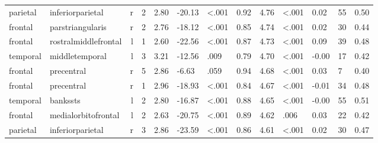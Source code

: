 \documentclass{article}
\begin{document}
\begin{longtable}{llrR{1.3cm}R{1cm}R{1.3cm}R{1cm}R{1cm}R{1.3cm}R{1cm}R{1.8cm}R{1.3cm}R{1.8cm}}
  parietal &          inferiorparietal &    r &         2 &                  2.80 &           -20.13 &      \textless.001 &                               0.92 &                          4.76 &                   \textless.001 &   0.02 &     55 &      0.50 \\
   frontal &          parstriangularis &    r &         2 &                  2.76 &           -18.12 &      \textless.001 &                               0.85 &                          4.74 &                   \textless.001 &   0.02 &     30 &      0.44 \\
   frontal &      rostralmiddlefrontal &    l &         1 &                  2.60 &           -22.56 &      \textless.001 &                               0.87 &                          4.73 &                   \textless.001 &   0.09 &     39 &      0.48 \\
  temporal &            middletemporal &    l &         3 &                  3.21 &           -12.56 &               .009 &                               0.79 &                          4.70 &                   \textless.001 &  -0.00 &     17 &      0.42 \\
   frontal &                precentral &    r &         5 &                  2.86 &            -6.63 &               .059 &                               0.94 &                          4.68 &                   \textless.001 &   0.03 &      7 &      0.40 \\
   frontal &                precentral &    r &         1 &                  2.96 &           -18.93 &      \textless.001 &                               0.84 &                          4.67 &                   \textless.001 &  -0.01 &     34 &      0.48 \\
  temporal &                  bankssts &    l &         2 &                  2.80 &           -16.87 &      \textless.001 &                               0.88 &                          4.65 &                   \textless.001 &  -0.00 &     55 &      0.51 \\
   frontal &       medialorbitofrontal &    l &         2 &                  2.63 &           -20.75 &      \textless.001 &                               0.89 &                          4.62 &                            .006 &   0.03 &     22 &      0.42 \\
  parietal &          inferiorparietal &    r &         3 &                  2.86 &           -23.59 &      \textless.001 &                               0.86 &                          4.61 &                   \textless.001 &   0.02 &     30 &      0.47 \\

\end{longtable}
\end{document}
